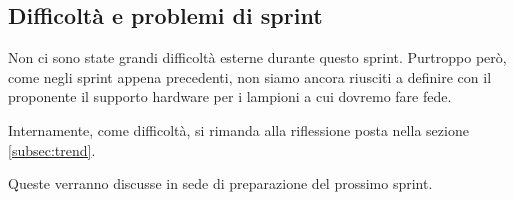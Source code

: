 \subsection{Difficoltà e problemi di sprint}

Non ci sono state grandi difficoltà esterne durante questo sprint. Purtroppo però, come negli sprint appena precedenti, non siamo ancora riusciti a definire con il proponente il supporto hardware per i lampioni a cui dovremo fare fede.

Internamente, come difficoltà, si rimanda alla riflessione posta nella sezione \ref{subsec:trend}.

Queste verranno discusse in sede di preparazione del prossimo sprint.
